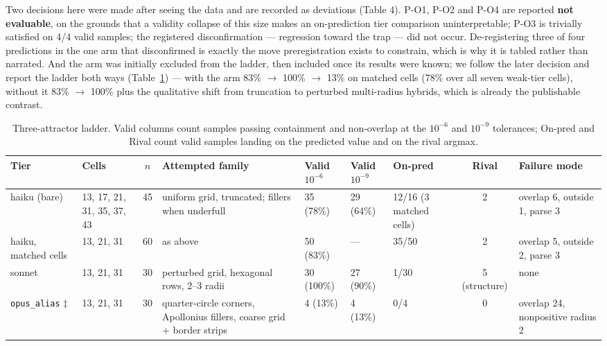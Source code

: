 Two decisions here were made after seeing the data and are recorded as deviations (Table 4).
P-O1, P-O2 and P-O4 are reported \textbf{not evaluable}, on the grounds that a validity collapse of
this size makes an on-prediction tier comparison uninterpretable; P-O3 is trivially satisfied on
4/4 valid samples; the registered disconfirmation --- regression toward the trap --- did not occur.
De-registering three of four predictions in the one arm that disconfirmed is exactly the move
preregistration exists to constrain, which is why it is tabled rather than narrated. And the arm
was initially excluded from the ladder, then included once its results were known; we follow the
later decision and report the ladder both ways (Table~\ref{tab:ladder}) --- with the arm 83\% $\rightarrow$ 100\% $\rightarrow$ 13\% on matched cells (78\% over all seven weak-tier cells), without it
83\% $\rightarrow$ 100\% plus the qualitative shift from truncation to perturbed multi-radius hybrids, which
is already the publishable contrast.

\begin{table}[t]
\centering
\caption{Three-attractor ladder. Valid columns count samples passing containment and non-overlap at the $10^{-6}$ and $10^{-9}$ tolerances; On-pred and Rival count valid samples landing on the predicted value and on the rival argmax.}
\label{tab:ladder}
\footnotesize
\setlength{\tabcolsep}{4pt}
\begin{tabular}{@{}p{1.7cm}p{1.2cm}cp{2.2cm}p{1.0cm}p{1.0cm}p{1.5cm}cp{2.0cm}@{}}
\toprule
Tier & Cells & $n$ & Attempted family & Valid $10^{-6}$ & Valid $10^{-9}$ & On-pred & Rival & Failure mode \\
\midrule
haiku (bare) & 13, 17, 21, 31, 35, 37, 43 & 45 & uniform grid, truncated; fillers when underfull & 35 (78\%) & 29 (64\%) & 12/16 (3 matched cells) & 2 & overlap 6, outside 1, parse 3 \\
haiku, matched cells & 13, 21, 31 & 60 & as above & 50 (83\%) & --- & 35/50 & 2 & overlap 5, outside 2, parse 3 \\
sonnet & 13, 21, 31 & 30 & perturbed grid, hexagonal rows, 2--3 radii & 30 (100\%) & 27 (90\%) & 1/30 & 5 (structure) & none \\
\texttt{opus\_alias} $\ddagger$ & 13, 21, 31 & 30 & quarter-circle corners, Apollonius fillers, coarse grid + border strips & 4 (13\%) & 4 (13\%) & 0/4 & 0 & overlap 24, nonpositive radius 2 \\
\bottomrule
\end{tabular}
\end{table}

